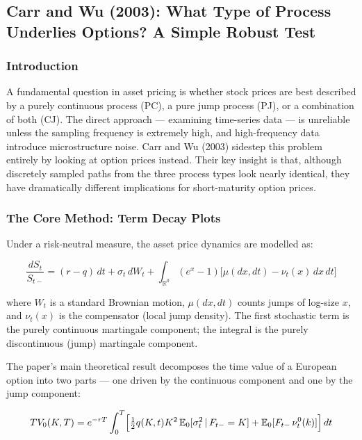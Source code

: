 \documentclass[12pt]{article}
\begin{document}
\subsection*{Carr and Wu (2003): What Type of Process Underlies Options? A Simple Robust Test}

\subsubsection*{Introduction}

A fundamental question in asset pricing is whether stock prices are best described
by a purely continuous process (PC), a pure jump process (PJ), or a combination
of both (CJ). The direct approach --- examining time-series data --- is unreliable
unless the sampling frequency is extremely high, and high-frequency data
introduce microstructure noise. Carr and Wu (2003) sidestep this problem
entirely by looking at option prices instead. Their key insight is that, although
discretely sampled paths from the three process types look nearly identical, they
have dramatically different implications for short-maturity option prices.

\subsubsection*{The Core Method: Term Decay Plots}

Under a risk-neutral measure, the asset price dynamics are modelled as:

\begin{equation}
    \frac{dS_t}{S_{t-}} = (r-q)\,dt + \sigma_t\,dW_t
    + \int_{\mathbb{R}^0}(e^x - 1)\bigl[\mu(dx,dt) - \nu_t(x)\,dx\,dt\bigr]
\end{equation}

where $W_t$ is a standard Brownian motion, $\mu(dx,dt)$ counts jumps of log-size
$x$, and $\nu_t(x)$ is the compensator (local jump density). The first stochastic
term is the purely continuous martingale component; the integral is the purely
discontinuous (jump) martingale component.

The paper's main theoretical result decomposes the time value of a European
option into two parts --- one driven by the continuous component and one by the
jump component:

\begin{equation}
    TV_0(K,T) = e^{-rT}\int_0^T
    \Bigl[\tfrac{1}{2}q(K,t)K^2\,\mathbb{E}_0[\sigma_t^2\,|\,F_{t-}=K]
    + \mathbb{E}_0[F_{t-}\,\nu_t^0(k)]\Bigr]\,dt
\end{equation}
\end{document}
